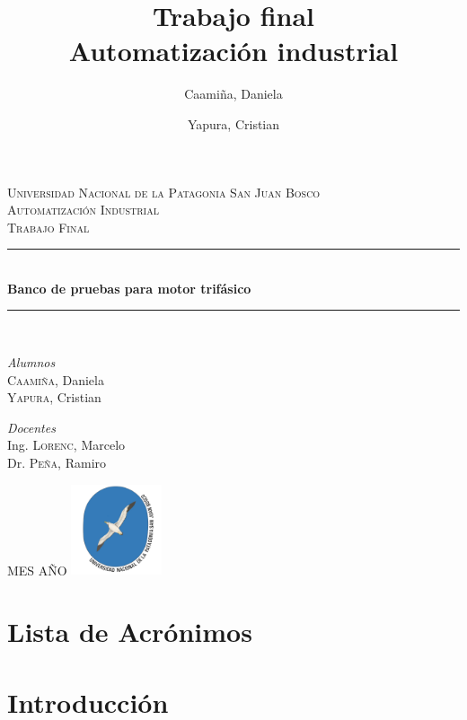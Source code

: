 \documentclass[12pt,a4paper]{article}
\date{}
\author{Caamiña, Daniela \and Yapura, Cristian}
\title{Trabajo final \\Automatización industrial}
\begin{document}
\begin{titlepage} %
	\newcommand{\HRule}{\rule{\linewidth}{0.5mm}}
	\center %
	\textsc{\LARGE Universidad Nacional de la Patagonia San Juan Bosco}\\[1.5cm]
	\textsc{\Large Automatización Industrial}\\[0.5cm]
	\textsc{\large Trabajo Final}\\[0.5cm]
	\HRule\\[0.4cm]
	\huge\bfseries{Banco de pruebas para motor trifásico}\\[0.2cm]
	\HRule\\[1.5cm]
	\begin{minipage}{0.4\textwidth}
		\begin{flushleft}
			\large
			\textit{Alumnos}\\
			\textsc{Caamiña,} Daniela \\
			\textsc{Yapura,} Cristian
		\end{flushleft}
	\end{minipage}
	\begin{minipage}{0.4\textwidth}
		\begin{flushright}
			\large
			\textit{Docentes}\\
			Ing. \textsc{Lorenc,} Marcelo \\
			Dr. \textsc{Peña,} Ramiro
		\end{flushright}
	\end{minipage}
	\vfill\vfill\vfill
	\large{MES AÑO}
	\vfill\vfill
	\includegraphics[width=0.2\textwidth]{unpsjb.png}\\[1cm]
	\vfill
\end{titlepage}

\tableofcontents
\newpage

\listoffigures
\newpage

\section*{Lista de Acrónimos}

\sloppy %

\section{Introducción}

\end{document}

